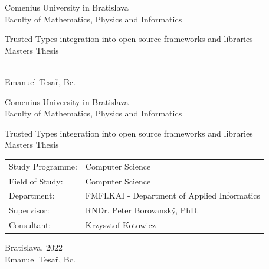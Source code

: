 \documentclass[12pt, twoside]{book}
\def\mfrok{2022}
\def\mfnazov{Trusted Types integration into open source frameworks and libraries}
\def\mftyp{Masters Thesis}
\def\mfautor{Emanuel Tesař, Bc.}
\def\mfskolitel{RNDr. Peter Borovanský, PhD.}
\def\mfkonzultant{Krzysztof Kotowicz}
\def\mfmiesto{Bratislava, \mfrok}
\def\mfodbor{Computer Science}
\def\program{Computer Science}
\def\mfpracovisko{ FMFI.KAI - Department of Applied Informatics }
\begin{document}
\frontmatter


\thispagestyle{empty}

\begin{center}
  \sc\large
  Comenius University in Bratislava\\
  Faculty of Mathematics, Physics and Informatics

  \vfill

  {\LARGE\mfnazov}\\
  \mftyp
\end{center}

\vfill

{\sc\large
  \noindent \mfrok\\
  \mfautor
}

\cleardoublepage


\thispagestyle{empty}
\noindent

\begin{center}
  \sc
  \large
  Comenius University in Bratislava\\
  Faculty of Mathematics, Physics and Informatics

  \vfill

  {\LARGE\mfnazov}\\
  \mftyp
\end{center}

\vfill

\noindent
\begin{tabular}{ll}
  Study Programme: & \program      \\
  Field of Study:  & \mfodbor      \\
  Department:      & \mfpracovisko \\
  Supervisor:      & \mfskolitel   \\
  Consultant:      & \mfkonzultant \\
\end{tabular}

\vfill


\noindent \mfmiesto\\
\mfautor

\cleardoublepage


\end{document}
